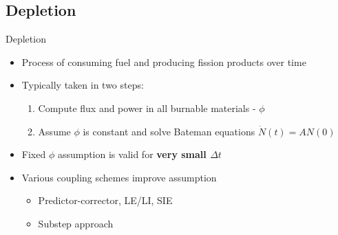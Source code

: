\documentclass{beamer}
\begin{document}
\subsection{Depletion}
\begin{frame}{Depletion}
    \begin{itemize}
        \item Process of consuming fuel and producing fission products over time
        \item Typically taken in two steps:
            \begin{enumerate}
                \item Compute flux and power in all burnable materials - $\phi$
                \item Assume $\phi$ is constant and solve Bateman equations $\dot{N}(t)=AN(0)$
            \end{enumerate}
        \item Fixed $\phi$ assumption is valid for \textbf{very small $\Delta t$}
        \item Various coupling schemes improve assumption
            \begin{itemize}
                \item Predictor-corrector, LE/LI, SIE
                \item Substep approach
            \end{itemize}
    \end{itemize}
\end{frame}
\end{document}
